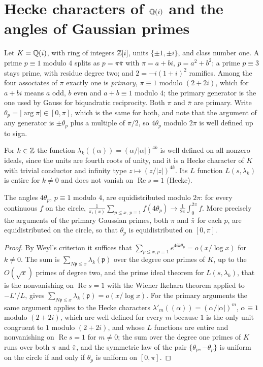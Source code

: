 \section{Hecke characters of \texorpdfstring{$\mathbb{Q}(i)$}{Q(i)} and the angles of Gaussian primes}\label{sec:gl1hecke}

Let $K=\mathbb{Q}(i)$, with ring of integers $\mathbb{Z}[i]$, units $\{\pm1,\pm i\}$, and class number one. A prime $p\equiv1$ modulo $4$ splits as $p=\pi\bar\pi$ with $\pi=a+bi$, $p=a^2+b^2$; a prime $p\equiv3$ stays prime, with residue degree two; and $2=-i(1+i)^2$ ramifies. Among the four associates of $\pi$ exactly one is \emph{primary}, $\pi\equiv1$ modulo $(2+2i)$, which for $a+bi$ means $a$ odd, $b$ even and $a+b\equiv1$ modulo $4$; the primary generator is the one used by Gauss for biquadratic reciprocity. Both $\pi$ and $\bar\pi$ are primary. Write $\theta_p=|\arg\pi|\in[0,\pi]$, which is the same for both, and note that the argument of any generator is $\pm\theta_p$ plus a multiple of $\pi/2$, so $4\theta_p$ modulo $2\pi$ is well defined up to sign.

For $k\in\mathbb{Z}$ the function $\lambda_k((\alpha))=(\alpha/|\alpha|)^{4k}$ is well defined on all nonzero ideals, since the units are fourth roots of unity, and it is a Hecke character of $K$ with trivial conductor and infinity type $z\mapsto(z/|z|)^{4k}$. Its $L$ function $L(s,\lambda_k)$ is entire for $k\ne0$ and does not vanish on $\operatorname{Re}s=1$ (Hecke).

\begin{theorem}\label{thm:gl1hecke}
The angles $4\theta_p$, $p\equiv1$ modulo $4$, are equidistributed modulo $2\pi$: for every continuous $f$ on the circle, $\frac1{\pi_1(x)}\sum_{p\le x,\,p\equiv1}f(4\theta_p)\to\frac1{2\pi}\int_0^{2\pi}f$. More precisely the arguments of the primary Gaussian primes, both $\pi$ and $\bar\pi$ for each $p$, are equidistributed on the circle, so that $\theta_p$ is equidistributed on $[0,\pi]$.
\end{theorem}

\begin{proof}
By Weyl's criterion it suffices that $\sum_{p\le x,p\equiv1}e^{4ik\theta_p}=o(x/\log x)$ for $k\ne0$. The sum is $\sum_{N\mathfrak p\le x}\lambda_k(\mathfrak p)$ over the degree one primes of $K$, up to the $O(\sqrt x)$ primes of degree two, and the prime ideal theorem for $L(s,\lambda_k)$, that is the nonvanishing on $\operatorname{Re}s=1$ with the Wiener Ikehara theorem applied to $-L'/L$, gives $\sum_{N\mathfrak p\le x}\lambda_k(\mathfrak p)=o(x/\log x)$. For the primary arguments the same argument applies to the Hecke characters $\lambda'_m((\alpha))=(\alpha/|\alpha|)^m$, $\alpha\equiv1$ modulo $(2+2i)$, which are well defined for every $m$ because $1$ is the only unit congruent to $1$ modulo $(2+2i)$, and whose $L$ functions are entire and nonvanishing on $\operatorname{Re}s=1$ for $m\ne0$; the sum over the degree one primes of $K$ runs over both $\pi$ and $\bar\pi$, and the symmetric law of the pair $\{\theta_p,-\theta_p\}$ is uniform on the circle if and only if $\theta_p$ is uniform on $[0,\pi]$.
\end{proof}

